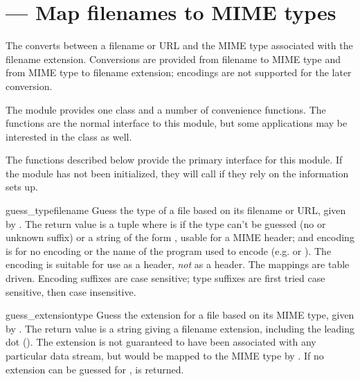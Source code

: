 \section{ ---
         Map filenames to MIME types}




The  converts between a filename or URL and the MIME
type associated with the filename extension.  Conversions are provided 
from filename to MIME type and from MIME type to filename extension;
encodings are not supported for the later conversion.

The module provides one class and a number of convenience functions.
The functions are the normal interface to this module, but some
applications may be interested in the class as well.

The functions described below provide the primary interface for this
module.  If the module has not been initialized, they will call
 if they rely on the information 
sets up.


\begin{funcdesc}{guess_type}{filename}
Guess the type of a file based on its filename or URL, given by
.  The return value is a tuple  where  is  if the type can't be
guessed (no or unknown suffix) or a string of the form
, usable for a MIME
 header; and encoding
is  for no encoding or the name of the program used to
encode (e.g.  or ).  The encoding is
suitable for use as a  header, \emph{not}
as a  header.  The mappings are
table driven.  Encoding suffixes are case sensitive; type suffixes are
first tried case sensitive, then case insensitive.
\end{funcdesc}

\begin{funcdesc}{guess_extension}{type}
Guess the extension for a file based on its MIME type, given by
.
The return value is a string giving a filename extension, including the
leading dot ().  The extension is not guaranteed to have been
associated with any particular data stream, but would be mapped to the 
MIME type  by .  If no extension can
be guessed for ,  is returned.
\end{funcdesc}


